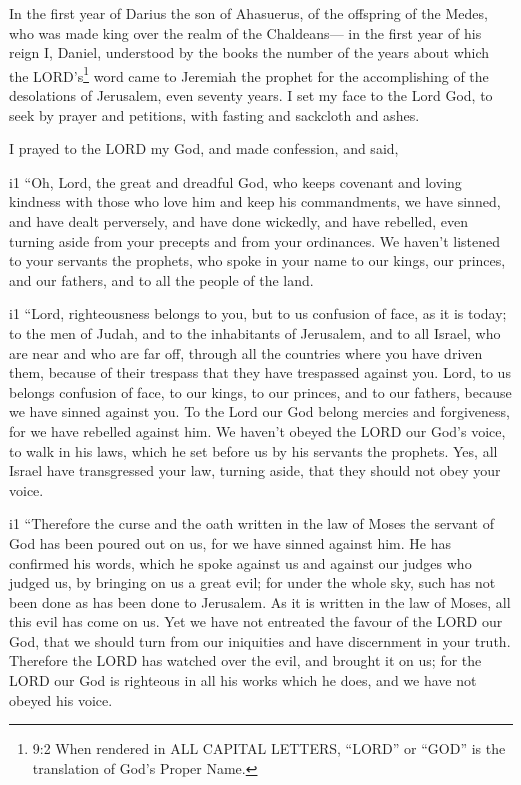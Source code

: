  In the first year of Darius the son of Ahasuerus, of the
offspring of the Medes, who was made king over the realm of the
Chaldeans---  in the first year of his reign I, Daniel,
understood by the books the number of the years about which the
LORD's\footnote{9:2 When rendered in ALL CAPITAL LETTERS, ``LORD'' or
  ``GOD'' is the translation of God's Proper Name.} word came to
Jeremiah the prophet for the accomplishing of the desolations of
Jerusalem, even seventy years.  I set my face to the Lord
God, to seek by prayer and petitions, with fasting and sackcloth and
ashes.

 I prayed to the LORD my God, and made confession, and said,

i1 ``Oh, Lord, the great and dreadful God, who keeps covenant and loving
kindness with those who love him and keep his commandments, 
we have sinned, and have dealt perversely, and have done wickedly, and
have rebelled, even turning aside from your precepts and from your
ordinances.  We haven't listened to your servants the
prophets, who spoke in your name to our kings, our princes, and our
fathers, and to all the people of the land.

i1 ``Lord, righteousness belongs to you, but to us confusion
of face, as it is today; to the men of Judah, and to the inhabitants of
Jerusalem, and to all Israel, who are near and who are far off, through
all the countries where you have driven them, because of their trespass
that they have trespassed against you.  Lord, to us belongs
confusion of face, to our kings, to our princes, and to our fathers,
because we have sinned against you.  To the Lord our God
belong mercies and forgiveness, for we have rebelled against him.
 We haven't obeyed the LORD our God's voice, to walk in his
laws, which he set before us by his servants the prophets. 
Yes, all Israel have transgressed your law, turning aside, that they
should not obey your voice.

i1 ``Therefore the curse and the oath written in the law of Moses the
servant of God has been poured out on us, for we have sinned against
him.  He has confirmed his words, which he spoke against us
and against our judges who judged us, by bringing on us a great evil;
for under the whole sky, such has not been done as has been done to
Jerusalem.  As it is written in the law of Moses, all this
evil has come on us. Yet we have not entreated the favour of the LORD
our God, that we should turn from our iniquities and have discernment in
your truth.  Therefore the LORD has watched over the evil,
and brought it on us; for the LORD our God is righteous in all his works
which he does, and we have not obeyed his voice.

